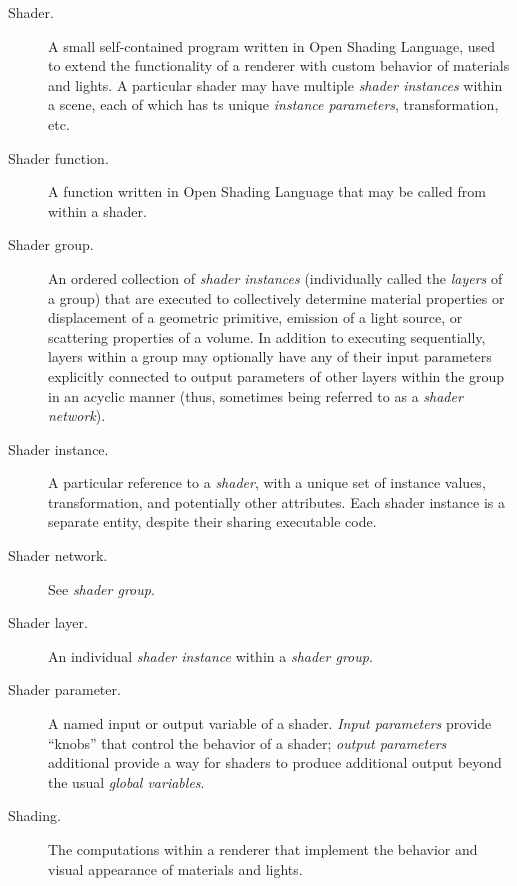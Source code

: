 \documentclass[11pt,letterpaper]{book}
\def\langname{Open Shading Language\xspace}
\begin{document}
\begin{appendix}
\begin{description}
\item[Shader.] A small self-contained program written in \langname, used
  to extend the functionality of a renderer with custom behavior of
  materials and lights.  A particular shader may have multiple
  \emph{shader instances} within a scene, each of which has ts unique
  \emph{instance parameters}, transformation, etc.

\item[Shader function.] A function written in \langname that may be
  called from within a shader.

\item[Shader group.] An ordered collection of \emph{shader instances}
  (individually called the \emph{layers} of a group) that are executed
  to collectively determine material properties or displacement of a
  geometric primitive, emission of a light source, or scattering
  properties of a volume.  In addition to executing sequentially, layers
  within a group may optionally have any of their input parameters
  explicitly connected to output parameters of other layers within the
  group in an acyclic manner (thus, sometimes being referred to as a
  \emph{shader network}).

\item[Shader instance.] A particular reference to a \emph{shader}, with
  a unique set of {\cf instance values}, transformation, and potentially
  other attributes.  Each shader instance is a separate entity, despite
  their sharing executable code.

\item[Shader network.] See \emph{shader group}.

\item[Shader layer.] An individual \emph{shader instance} within a
  \emph{shader group}.

\item[Shader parameter.] A named input or output variable of a shader.
  \emph{Input parameters} provide ``knobs'' that control the behavior of
  a shader; \emph{output parameters} additional provide a way for
  shaders to produce additional output beyond the usual \emph{global
    variables}.

\item[Shading.] The computations within a renderer that implement the
  behavior and visual appearance of materials and lights.

\end{description}

\end{appendix}

\backmatter

%

\printindex
\end{document}
